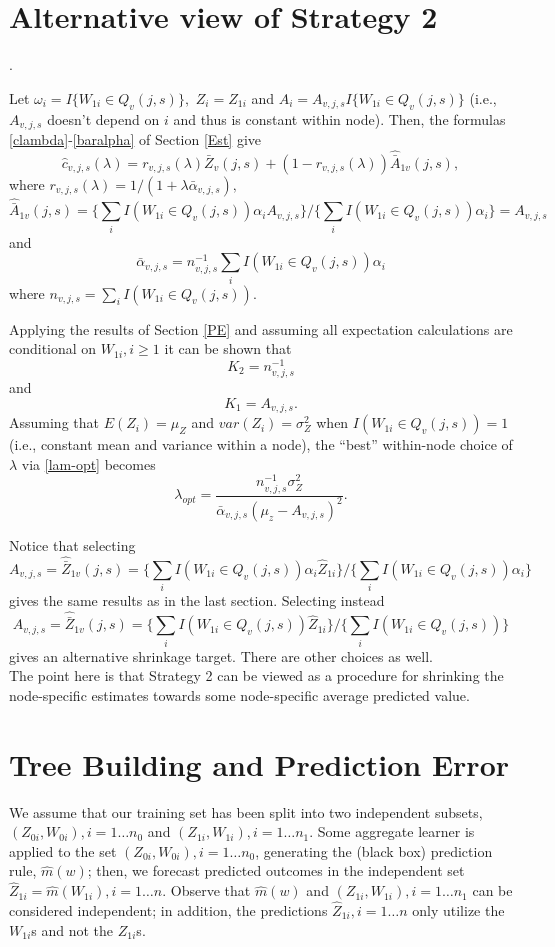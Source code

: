 \documentclass[12pt]{article}
\begin{document}
\section{Alternative view of Strategy 2}.

Let $\omega_i = I\{ W_{1i} \in Q_{v}(j,s) \},$ $Z_i = Z_{1i}$ and $A_i
= A_{v,j,s} I\{ W_{1i} \in Q_{v}(j,s) \}$ (i.e., $A_{v,j,s}$ doesn't
depend on $i$ and thus is constant within node).  Then, the formulas
\eqref{clambda}-\eqref{baralpha} of Section \ref{Est} give
 \[
\widehat{c}_{v,j,s}(\lambda) = r_{v,j,s}(\lambda) \bar{Z}_v(j,s) +
(1-r_{v,j,s}(\lambda)) \hat{\bar{A}}_{1v}(j,s),
\]
where $r_{v,j,s}(\lambda) = 1/(1 + \lambda \bar{\alpha}_{v,j,s}),$
\[
\hat{\bar{A}}_{1v}(j,s) =
\{ \sum_i I(W_{1i} \in Q_{v}(j,s)) \alpha_i  A_{v,j,s}  \}
/ \{ \sum_i I(W_{1i} \in Q_{v}(j,s)) \alpha_i \} = A_{v,j,s}
\]
and
\[
\bar{\alpha}_{v,j,s} =  n^{-1}_{v,j,s} \sum_i I(W_{1i} \in Q_{v}(j,s)) \alpha_i
\]
where $n_{v,j,s} =  \sum_i I( W_{1i} \in Q_{v}(j,s) ).$

Applying the results of Section \ref{PE} and assuming all expectation
calculations are conditional on $W_{1i}, i \geq 1$ it can be shown that
\[
K_2 = n^{-1}_{v,j,s}
\]
and
\[
K_1 = A_{v,j,s}.
\]
Assuming that $E(Z_i) = \mu_Z$ and $var(Z_i) = \sigma^2_Z$ when $I(
W_{1i} \in Q_{v}(j,s) ) =1$ (i.e., constant mean and variance within a
node), the ``best'' within-node choice of $\lambda$ via
\eqref{lam-opt} becomes
\[
\lambda_{opt} = \frac{n^{-1}_{v,j,s} \sigma^2_Z}{ \bar{\alpha}_{v,j,s} (\mu_z -  A_{v,j,s})^2}.
\]

Notice that selecting
\[
A_{v,j,s} = \hat{\bar{Z}}_{1v}(j,s) =
\{ \sum_i I(W_{1i} \in Q_{v}(j,s)) \alpha_i  \hat{Z}_{1i} \}
/ \{ \sum_i I(W_{1i} \in Q_{v}(j,s)) \alpha_i \}
\]
gives the same results as in the last section. Selecting instead
\[
A_{v,j,s} = \hat{\bar{Z}}_{1v}(j,s) =
\{ \sum_i I(W_{1i} \in Q_{v}(j,s))  \hat{Z}_{1i} \}
/ \{ \sum_i I(W_{1i} \in Q_{v}(j,s))  \}
\]
gives an alternative shrinkage target.  There are other choices as well.\\

The point here is that Strategy 2 can be viewed as a procedure for
shrinking the node-specific estimates towards some node-specific
average predicted value.

\section{Tree Building and Prediction Error}
\label{PE-tree}

We assume that our training set has been split into two independent subsets,
$(Z_{0i},W_{0i}), i = 1 \ldots n_0$ and $(Z_{1i}, W_{1i}), i = 1
\ldots n_1$. Some aggregate learner is applied to 
the set $(Z_{0i}, W_{0i}), i = 1 \ldots
n_0$, generating the (black box) prediction rule, $\hat{m}(w)$; then,
we forecast predicted outcomes in the independent set $\widehat{Z}_{1i} =
\hat{m}(W_{1i}), i = 1 \ldots n$.  Observe that $\hat{m}(w)$ and
$(Z_{1i}, W_{1i}), i = 1 \ldots n_1$ can be considered independent; in
addition, the predictions $\widehat{Z}_{1i}, i = 1 \ldots n$ only
utilize the $W_{1i}$s and not the $Z_{1i}$s. 
\end{document}

